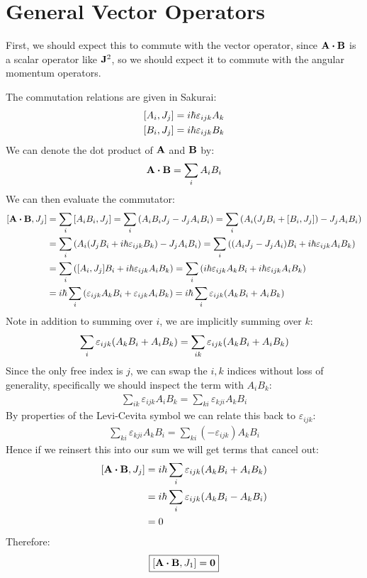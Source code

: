 \documentclass[12pt]{article}
\newcommand{\veps}{\varepsilon}
\begin{document}
\section{General Vector Operators}
First, we should expect this to commute with the vector operator, since $\vb{A}\vdot\vb{B}$ is a scalar operator like $\vb{J}^2$, so we should expect it to commute with the angular momentum operators.

The commutation relations are given in Sakurai:
\begin{align*}
  \comm{A_i}{J_j}&=i\hbar\veps_{ijk}A_k\\
  \comm{B_i}{J_j}&=i\hbar\veps_{ijk}B_k
\end{align*}
We can denote the dot product of $\vb{A}$ and $\vb{B}$ by:
\begin{align*}
  \vb{A\vdot B}=\sum_iA_iB_i
\end{align*}
We can then evaluate the commutator:
\begin{align*}
  \comm{\vb{A\vdot B}}{J_j}&=\sum_i\comm{A_iB_i}{J_j}
  =\sum_i\qty(A_iB_iJ_j-J_jA_iB_i)
  =\sum_i\qty(A_i(J_jB_i+\comm{B_i}{J_j})-J_jA_iB_i)\\
  &=\sum_i\qty(A_i(J_jB_i+i\hbar\veps_{ijk}B_k)-J_jA_iB_i)
  =\sum_i\qty((A_iJ_j-J_jA_i)B_i+i\hbar\veps_{ijk}A_iB_k)\\
  &=\sum_i\qty(\comm{A_i}{J_j}B_i+i\hbar\veps_{ijk}A_iB_k)
  =\sum_i\qty(i\hbar\veps_{ijk}A_kB_i+i\hbar\veps_{ijk}A_iB_k)\\
  &=i\hbar\sum_i\qty(\veps_{ijk}A_kB_i+\veps_{ijk}A_iB_k)
  =i\hbar\sum_i\veps_{ijk}\qty(A_kB_i+A_iB_k)
\end{align*}
Note in addition to summing over $i$, we are implicitly summing over $k$:
\begin{align*}
  \sum_i\veps_{ijk}\qty(A_kB_i+A_iB_k)=\sum_{ik}\veps_{ijk}\qty(A_kB_i+A_iB_k)
\end{align*}
Since the only free index is $j$, we can swap the $i,k$ indices without loss of generality, specifically we should inspect the term with $A_iB_k$:
\begin{align*}
  \sum_{ik}\veps_{ijk}A_iB_k=\sum_{ki}\veps_{kji}A_kB_i
\end{align*}
By properties of the Levi-Cevita symbol we can relate this back to $\veps_{ijk}$:
\begin{align*}
  \sum_{ki}\veps_{kji}A_kB_i=\sum_{ki}(-\veps_{ijk})A_kB_i
\end{align*}
Hence if we reinsert this into our sum we will get terms that cancel out:
\begin{align*}
  \comm{\vb{A\vdot B}}{J_j}&=i\hbar\sum_i\veps_{ijk}\qty(A_kB_i+A_iB_k)\\
  &=i\hbar\sum_i\veps_{ijk}\qty(A_kB_i-A_kB_i)\\
  &=0
\end{align*}
Therefore:
\begin{align}
  \boxed{\comm{\vb{A\vdot B}}{J_1}=\vb{0}}
\end{align}
\end{document}
